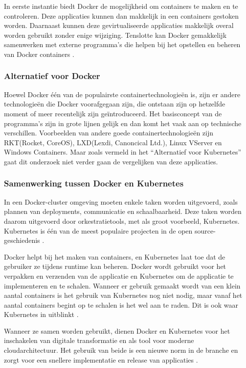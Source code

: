 In eerste instantie biedt Docker de mogelijkheid om containers te maken en te controleren. Deze applicaties kunnen dan makkelijk in een containers gestoken worden. Daarnaast kunnen deze gevirtualiseerde applicaties makkelijk overal worden gebruikt zonder enige wijziging. Tenslotte kan Docker gemakkelijk samenwerken met externe programma's die helpen bij het opstellen en beheren van Docker containers \autocite{Rad2017}.

\subsubsection{Alternatief voor Docker}
Hoewel Docker één van de populairste containertechnologieën is, zijn er andere technologieën die Docker voorafgegaan zijn, die ontstaan zijn op hetzelfde moment of meer recentelijk zijn geïntroduceerd. Het basisconcept van de programma's zijn in grote lijnen gelijk en dan komt het vaak aan op technische verschillen. Voorbeelden van andere goede containertechnologieën zijn RKT(Rocket, CoreOS), LXD(Lexdi, Canoncical Ltd.), Linux VServer en Windows Containers. Maar zoals vermeld in het “Alternatief voor Kubernetes” gaat dit onderzoek niet verder gaan de vergelijken van deze applicaties. 

\subsubsection{Samenwerking tussen Docker en Kubernetes}
In een Docker-cluster omgeving moeten enkele taken worden uitgevoerd, zoals plannen van deployments, communicatie en schaalbaarheid. Deze taken worden daarom uitgevoerd door orkestratietools, met als groot voorbeeld, Kubernetes. Kubernetes is één van de meest populaire projecten in de open source-geschiedenis \autocite{Journal2020}.

Docker helpt bij het maken van containers, en Kubernetes laat toe dat de gebruiker ze tijdens runtime kan beheren. Docker wordt gebruikt voor het verpakken en verzenden van de applicatie en Kubernetes om de applicatie te implementeren en te schalen. Wanneer er gebruik gemaakt wordt van een klein aantal containers is het gebruik van Kubernetes nog niet nodig, maar vanaf het aantal containers begint op te schalen is het wel aan te raden. Dit is ook waar Kubernetes in uitblinkt \autocite{Journal2020}. 

Wanneer ze samen worden gebruikt, dienen Docker en Kubernetes voor het inschakelen van digitale transformatie en als tool voor moderne cloudarchitectuur. Het gebruik van beide is een nieuwe norm in de branche en zorgt voor een snellere implementatie en release van applicaties \autocite{Journal2020}. 

